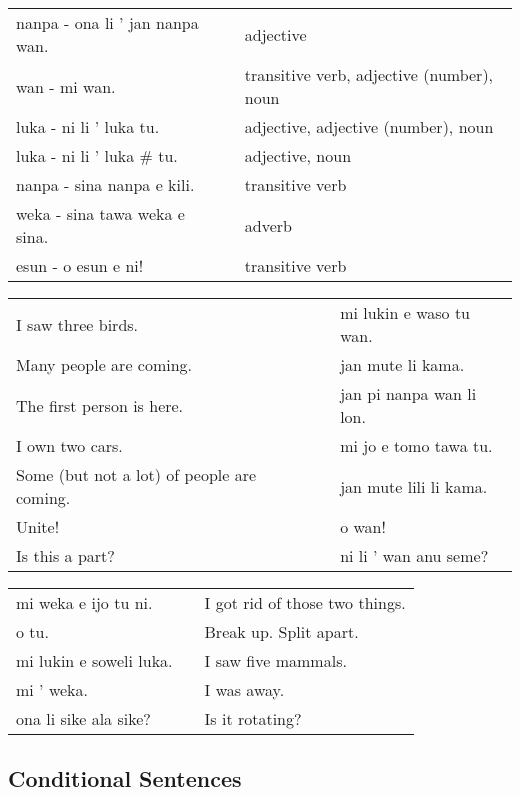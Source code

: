 \begin{supertabular}{p{5,5cm}|ll}
nanpa - ona li ' jan nanpa wan. && adjective \\ %
wan - mi wan. && transitive verb, adjective (number), noun \\ %
luka - ni li ' luka tu. && adjective, adjective (number), noun \\ %
luka - ni li ' luka # tu. && adjective, noun \\ %
nanpa - sina nanpa e kili. && transitive verb \\ %
weka - sina tawa weka e sina. && adverb \\ %
esun - o esun e ni! && transitive verb \\ %
\end{supertabular}

\begin{supertabular}{p{5,5cm}|ll}
I saw three birds.  && mi lukin e waso tu wan. \\ %
Many people are coming.  && jan mute li kama. \\ %
The first person is here.  && jan pi nanpa wan li lon. \\ %
I own two cars.  && mi jo e tomo tawa tu. \\ %
Some (but not a lot) of people are coming.  && jan mute lili li kama. \\ %
Unite!  && o wan! \\ %
Is this a part? && ni li ' wan anu seme? \\ %
\end{supertabular}  

\begin{supertabular}{p{5,5cm}|ll}
mi weka e ijo tu ni.  && I got rid of those two things. \\
o tu.  && Break up. Split apart. \\
mi lukin e soweli luka.  && I saw five mammals. \\
mi ' weka.  && I was away. \\
ona li sike ala sike? && Is it rotating? \\
\end{supertabular} 

\newpage
%
\subsection*{Conditional Sentences} 
\label{'la'}
%

